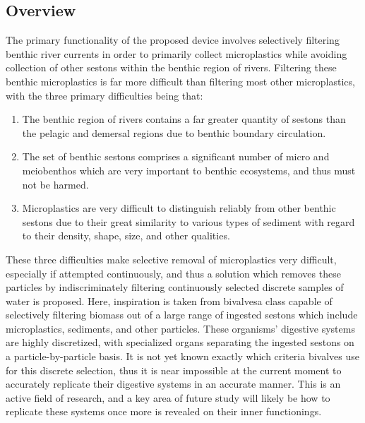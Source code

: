 \documentclass[fleqn,10pt]{SelfArx} %
\begin{document}
	\subsection{Overview}
	The primary functionality of the proposed device involves selectively filtering \gls{benthic} river currents in order to primarily collect microplastics while avoiding collection of other \glspl{seston} within the \gls{benthic} region of rivers. Filtering these \gls{benthic} microplastics is far more difficult than filtering most other microplastics, with the three primary difficulties being that: 
	\begin{enumerate}
		\item The \gls{benthic} region of rivers contains a far greater quantity of \glspl{seston} than the \gls{pelagic} and \gls{demersal} regions due to \gls{benthic} boundary circulation.
		\item The set of \gls{benthic} \glspl{seston} comprises a significant number of micro and meiobenthos which are very important to \gls{benthic} ecosystems, and thus must not be harmed. 
		\item Microplastics are very difficult to distinguish reliably from other \gls{benthic} \glspl{seston} due to their great similarity to various types of sediment with regard to their density, shape, size, and other qualities.
	\end{enumerate}
	These three difficulties make selective removal of microplastics very difficult, especially if attempted continuously, and thus a solution which removes these particles by indiscriminately filtering continuously selected discrete samples of water is proposed. Here, inspiration is taken from bivalves\textemdash a class capable of selectively filtering biomass out of a large range of ingested \glspl{seston} which include microplastics, sediments, and other particles. These organisms’ digestive systems are highly discretized, with specialized organs separating the ingested \glspl{seston} on a particle-by-particle basis. It is not yet known exactly which criteria bivalves use for this discrete selection, thus it is near impossible at the current moment to accurately replicate their digestive systems in an accurate manner. This is an active field of research, and a key area of future study will likely be how to replicate these systems once more is revealed on their inner functionings. 
	
\end{document}

